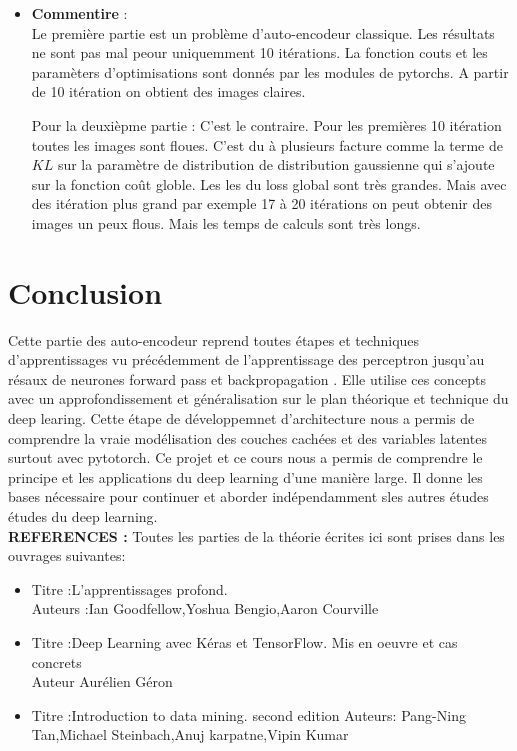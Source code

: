 \documentclass[12pt,a4paper]{report}
\begin{document}
\begin{itemize}[label=\textbullet, font=\LARGE \color{blue}]
\item  \textbf{Commentire} : \\
Le première partie est un problème d'auto-encodeur classique. Les résultats ne sont pas  mal peour uniquemment 10 itérations. La fonction couts et les paramèters d'optimisations sont donnés par les modules de pytorchs. A partir de 10 itération on obtient des images claires. 

Pour la deuxièpme partie :
 C'est le contraire. Pour les premières   10 itération toutes les images sont floues. C'est du à plusieurs facture comme la terme de $KL$ sur la paramètre de distribution de distribution gaussienne qui s'ajoute sur la fonction coût globle.
 Les les du loss global sont très grandes. Mais avec des itération plus grand par exemple 17 à 20 itérations  on peut obtenir des images un peux flous. Mais les temps de calculs sont très longs. 
 

\end{itemize}



\section{Conclusion }

Cette partie des auto-encodeur reprend toutes étapes et techniques  d'apprentissages vu précédemment de l'apprentissage des perceptron jusqu'au  résaux de neurones forward pass et backpropagation  . Elle  utilise ces concepts avec un approfondissement et généralisation sur le plan théorique et technique du deep learing.   
Cette étape de développemnet d'architecture nous a permis de comprendre la vraie modélisation des couches cachées et des variables latentes surtout  avec pytotorch.
Ce projet et ce cours  nous a permis de comprendre le principe et les applications du deep learning d'une manière large. Il donne  les bases nécessaire pour continuer  et aborder indépendamment sles autres études études du deep learning.\\


\textbf{REFERENCES :}
Toutes les parties de la théorie écrites ici  sont prises dans les ouvrages suivantes:  

\begin{itemize}[label=\textbullet, font=\LARGE \color{blue}]
\item Titre :L'apprentissages profond.\\
 Auteurs :Ian Goodfellow,Yoshua Bengio,Aaron Courville
 \item Titre :Deep Learning avec Kéras et TensorFlow. Mis en oeuvre et cas concrets\\
 Auteur Aurélien Géron
 
 \item Titre :Introduction to data mining. second edition
 Auteurs:
 Pang-Ning Tan,Michael Steinbach,Anuj karpatne,Vipin Kumar
 
 
 
 
\end{itemize}
\end{document}

